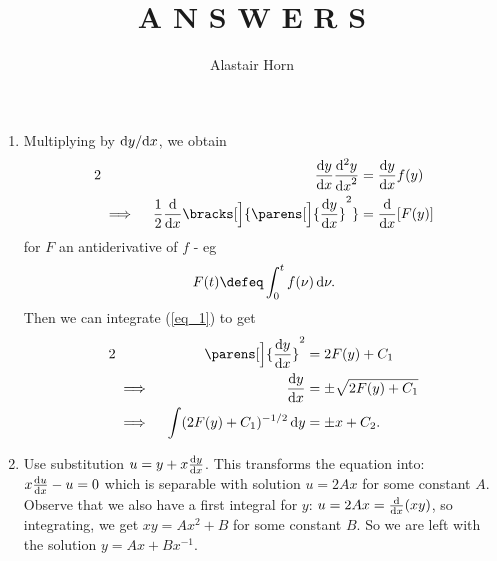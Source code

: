 \documentclass[a4paper,12pt,fleqn]{article}
\author{Alastair Horn}
\title{A N S W E R S}
\begin{document}
\maketitle

\begin{enumerate}
 \item

  Multiplying by \(\fdv<y>{x}\), we obtain
  \begin{alignat}2
   && \dv<y>{x} \dv[2]<y>{x} &{}= \dv<y>{x}f(y) \nonumber \\
   &\implies{}& \frac 12 \dv{x} \bracks[\Big]{\parens[\Big]{\dv<y>{x}}^2}
    &{}= \dv{x} [F(y)] \label{eq_1}
  \end{alignat}
  for \(F\) an antiderivative of \(f\) - eg
  \begin{equation*}
   F(t) \defeq \integ[0]<t>{f(\nu)}{\nu}.
  \end{equation*}
  Then we can integrate (\ref{eq_1}) to get
  \begin{alignat*}2
   && \parens[\Big]{\dv<y>{x}}^2 &{}= 2F(y) + C_1 \\
   &\implies{}& \dv<y>{x} &{}= \pm \sqrt{2F(y) + C_1} \\
   &\implies{}& \integ{(2F(y) + C_1)^{-1/2}}{y} &{}= \pm x + C_2.
  \end{alignat*}

 \item

  Use substitution \(u = y + x\dv<y>{x}\). This transforms the
  equation into: \(x\dv<u>{x} - u = 0\) which is separable with
  solution \(u = 2Ax\) for some constant \(A\). Observe that we also have a
  first integral for \(y\): \(u = 2Ax = \dv{x}(xy)\), so integrating, we get
  \(xy = Ax^2 + B\) for some constant \(B\). So we are left with the solution
  \(y = Ax + Bx^{-1}\).


\end{enumerate}
\end{document}
